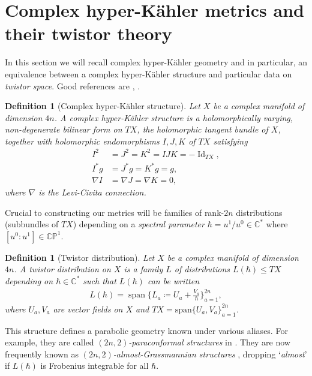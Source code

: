 \documentclass[a4paper,12pt,reqno]{amsart}
\newcounter{counter2}
\numberwithin{equation}{section}
\numberwithin{counter2}{section}
\newcounter{counter3}
\newtheorem{defn}[counter2]{Definition}
\begin{document}
\section{Complex hyper-K\"ahler metrics and their twistor theory}\label{HKintro}
In this section we will recall complex hyper-K\"ahler geometry and in particular,  an equivalence between a complex hyper-K\"ahler structure and particular data on \textit{twistor space}.  Good references are \cite{BS}, \cite{BE}.  \par
\begin{defn}[Complex hyper-K\"ahler structure]
Let $X$ be a complex manifold of dimension $4n$.  A \textit{complex} hyper-K\"ahler structure is a holomorphically varying,  non-degenerate bilinear form on $TX$,  the holomorphic tangent bundle of $X$,  together with holomorphic endomorphisms $I,J,K$ of $TX$  satisfying
 \begin{align}
 I^2 &= J^2 = K^2 = IJK = -\operatorname{Id}_{TX}, \\
 I^*g &= J^*g = K^*g = g,  \nonumber \\
 \nabla I &= \nabla J = \nabla K = 0,  \nonumber
 \end{align}
 where $\nabla$ is the Levi-Civita connection. 
\end{defn}
Crucial to constructing our metrics will be families of rank-$2n$ distributions (subbundles of $TX$) depending on a \textit{spectral parameter} $\hbar = u^1/u^0 \in \mathbb{C}^*$ where $[u^0:u^1] \in \mathbb{CP}^1$.  
\begin{defn}[Twistor distribution]\label{twistor_distribution_def}
Let $X$ be a complex manifold of dimension $4n$.  A \textit{twistor distribution} on $X$ is a family $L$ of distributions $L(\hbar) \le TX$ depending on $\hbar \in \mathbb{C}^*$ such that $L(\hbar)$ can be written 
  \begin{align}\label{Lax_distribution}
L(\hbar) = \operatorname{span}\Big\{L_a \coloneqq U_a + \frac{V_a}{\hbar}\Big\}_{a=1}^{2n},  
\end{align}
where $U_a,V_a$ are vector fields on $X$ and 
$TX = \mathrm{span}\{U_{a},  V_{a}\}_{a=1}^{2n}$.  
\end{defn}
 This structure defines a parabolic geometry known under various aliases.  
 For example,  they are called \textit{$(2n,2)$-paraconformal structures} in \cite{BE}.  They are now frequently known as \textit{$(2n,2)$-almost-Grassmannian structures} \cite{CS},  dropping 
 `\textit{almost}' if $L(\hbar)$ is Frobenius integrable for all $\hbar$.  \par 
\end{document}
